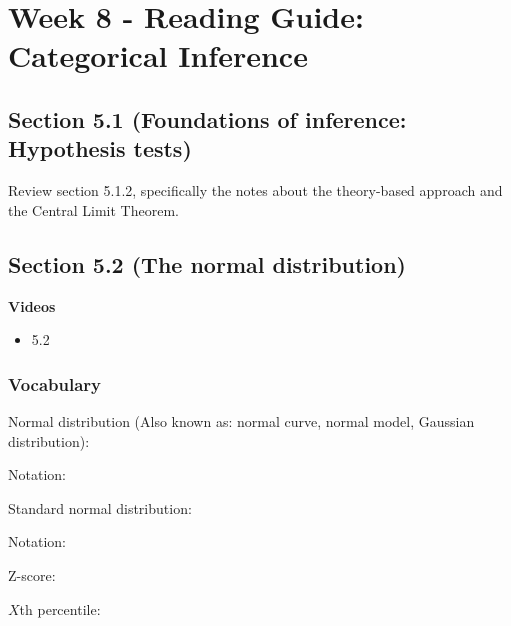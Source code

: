\documentclass[
]{report}
\providecommand{\tightlist}{%
  \setlength{\itemsep}{0pt}\setlength{\parskip}{0pt}}
\newcommand{\rgs}{\vspace{12pt}} %
\newcommand{\rgi}{\hspace{24pt}}  %
\begin{document}
\hypertarget{week-8---reading-guide-categorical-inference}{%
\section{Week 8 - Reading Guide: Categorical Inference}\label{week-8---reading-guide-categorical-inference}}

\hypertarget{section-5.1-foundations-of-inference-hypothesis-tests-1}{%
\subsection*{Section 5.1 (Foundations of inference: Hypothesis tests)}\label{section-5.1-foundations-of-inference-hypothesis-tests-1}}

Review section 5.1.2, specifically the notes about the theory-based approach and the Central Limit Theorem.

\hypertarget{section-5.2-the-normal-distribution}{%
\subsection*{Section 5.2 (The normal distribution)}\label{section-5.2-the-normal-distribution}}


\textbf{Videos}

\begin{itemize}
\tightlist
\item
  5.2
\end{itemize}


\hypertarget{vocabulary-12}{%
\subsubsection*{Vocabulary}\label{vocabulary-12}}

Normal distribution (Also known as: normal curve, normal model, Gaussian distribution):
\rgs

\rgi Notation:
\rgs

Standard normal distribution:
\rgs

\rgi Notation:
\rgs

Z-score:
\rgs

\(X\)th percentile:
\rgs
\end{document}
